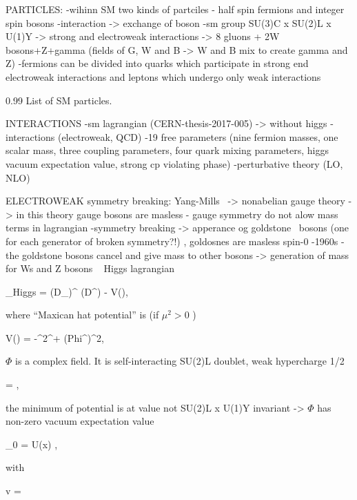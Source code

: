 PARTICLES:
-wihinn SM two kinds of partciles - half spin fermions and integer spin bosons
-interaction -> exchange of boson
-sm group SU(3)C x SU(2)L x U(1)Y -> strong and electroweak interactions -> 8 gluons + 2W bosons+Z+gamma (fields of G, W and B -> W and B mix to create gamma and Z)
-fermions can be divided into  quarks which participate in strong end electroweak interactions and leptons which undergo only weak interactions

                 {0.99}       %
                 { List of SM particles. }


INTERACTIONS
-sm lagrangian (CERN-thesis-2017-005) -> without higgs
-interactions (electroweak, QCD)
-19 free parameters (nine fermion masses, one scalar mass, three coupling parameters, four quark mixing parameters, higgs vacuum expectation value, strong cp violating phase)
-perturbative theory (LO, NLO)


ELECTROWEAK symmetry breaking:
Yang-Mills~\cite{Yang:1954ek} -> nonabelian gauge theory
-> in this theory gauge bosons are masless - gauge symmetry do not alow mass terms in lagrangian
-symmetry breaking -> apperance og goldstone~\cite{Goldstone:1961eq} bosons (one for each generator of broken symmetry?!) , goldosnes are masless spin-0
-1960s - the goldstone bosons cancel and give mass to other bosons -> generation of mass for Ws and Z bosons ~\cite{Englert:1964et, Higgs:1964ia, Guralnik:1964eu, Higgs:1966ev}
Higgs lagrangian

{
    _{Higgs} =  (D_{\mu}\Phi)^{\dagger} (D^{\mu}\Phi) - V(\Phi),
}

where ``Maxican hat potential'' is (if $\mu^2> 0$ )

{
    V(\Phi) =  -\mu^{2}\Phi^{\dagger}\Phi + \lambda(Phi^{\dagger}\Phi)^{2},
}

$\Phi$ is a complex field. It is self-interacting SU(2)L doublet, weak hypercharge 1/2


{
    \Phi =  ,
}

the minimum of potential is at value not SU(2)L x U(1)Y invariant -> $\Phi$ has non-zero vacuum expectation value


{
    \langle \Phi \rangle_{0} = U(x) ,
}

with

{
v = 
}

